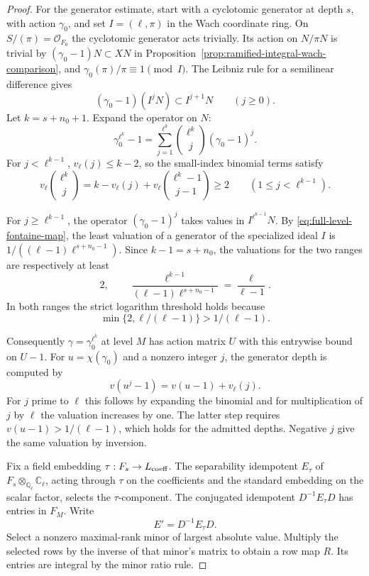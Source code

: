 \begin{proof}
For the generator estimate, start with a
cyclotomic generator at depth \(s\), with action
\(\gamma_0\), and set \(I=(\ell,\pi)\) in the
Wach coordinate ring. On \(S/(\pi)=\mathcal O_{F_0}\) the cyclotomic
generator acts trivially. Its action on \(N/\pi N\) is trivial
by \((\gamma_0-1)N\subset XN\) in
Proposition~\ref{prop:ramified-integral-wach-comparison}, and \(\gamma_0(\pi)/\pi\equiv1\pmod I\).
The Leibniz rule for a semilinear difference gives
\[
   (\gamma_0-1)(I^j N)\subset I^{j+1}N
           \qquad(j\ge 0).
\]
Let \(k=s+n_0+1\). Expand the operator on \(N\):
\[
  \gamma_0^{\ell^k}-1
       =\sum_{j=1}^{\ell^k}\binom{\ell^k}{j}(\gamma_0-1)^j .
\]
For \(j<\ell^{k-1}\), \(v_\ell(j)\le k-2\), so the small-index binomial terms satisfy
\[
 v_\ell\binom{\ell^k}{j}
 =k-v_\ell(j)+v_\ell\binom{\ell^k-1}{j-1}\ge2
 \qquad(1\le j<\ell^{k-1}).
\]

For \(j\ge\ell^{k-1}\), the
operator \((\gamma_0-1)^j\) takes values in
\(I^{\ell^{k-1}}N\). By \eqref{eq:full-level-fontaine-map}, the least valuation of a
generator of the specialized ideal \(I\) is
\(1/((\ell-1)\ell^{s+n_0-1})\). Since \(k-1=s+n_0\),
the valuations for the two ranges are respectively at least
\[
     2,\qquad
     \frac{\ell^{k-1}}{(\ell-1)\ell^{s+n_0-1}}
                =\frac{\ell}{\ell-1}.
\]
In both ranges the strict logarithm threshold holds because
\[
 \min\{2,\ell/(\ell-1)\}>1/(\ell-1).
\]

Consequently \(\gamma=\gamma_0^{\ell^k}\) at level \(M\)
has action matrix \(U\) with this entrywise bound on \(U-1\).
For \(u=\chi(\gamma_0)\) and a nonzero integer \(j\), the generator depth is computed by
\[
 v(u^j-1)=v(u-1)+v_\ell(j).
\]
For \(j\) prime to \(\ell\)
this follows by expanding the binomial and for
multiplication of \(j\) by \(\ell\) the valuation
increases by one. The latter step requires
\(v(u-1)>1/(\ell-1)\), which holds for the admitted
depths. Negative \(j\) give the same valuation by
inversion.

Fix a field embedding \(\tau:F_s\to L_{\rm coeff}\).
The separability idempotent \(E_\tau\) of
\(F_s\otimes_{\mathbb Q_\ell}\mathbb C_\ell\), acting
through \(\tau\) on the coefficients and the standard
embedding on the scalar factor, selects the
\(\tau\)-component. The conjugated idempotent
\(D^{-1}E_\tau D\) has entries in \(F_M\).
Write
\[
 E'=D^{-1}E_\tau D.
\]
Select a nonzero
maximal-rank minor of largest absolute value.
Multiply the selected rows by the inverse of
that minor's matrix to obtain a row map \(R\).
Its entries are integral by the minor ratio rule.


\end{proof}
